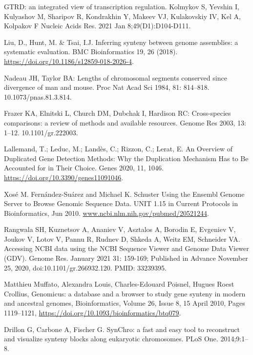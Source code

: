 \documentclass[12pt]{article}
\begin{document}

\normalsize
\begin{thebibliography}{99}

 GTRD: an integrated view of transcription regulation.
Kolmykov S, Yevshin I, Kulyashov M, Sharipov R, Kondrakhin Y, Makeev VJ,
Kulakovskiy IV, Kel A, Kolpakov F Nucleic Acids Res. 2021 Jan
8;49(D1):D104-D111.

 Liu, D., Hunt, M. \& Tsai, I.J. Inferring synteny between
genome assemblies: a systematic evaluation. BMC Bioinformatics 19, 26 (2018).
\url{https://doi.org/10.1186/s12859-018-2026-4}.

 Nadeau JH, Taylor BA: Lengths of chromosomal segments
conserved since divergence of man and mouse. Proc Nat Acad Sci 1984,
81: 814–818. 10.1073/pnas.81.3.814.

 Frazer KA, Elnitski L, Church DM, Dubchak I, Hardison RC:
Cross-species comparisons: a review of methods and available resources.
Genome Res 2003, 13: 1–12. 10.1101/gr.222003.

 Lallemand, T.; Leduc, M.; Landès, C.; Rizzon, C.; Lerat, E.
An Overview of Duplicated Gene Detection Methods: Why the Duplication Mechanism
Has to Be Accounted for in Their Choice. Genes 2020, 11, 1046.
\url{https://doi.org/10.3390/genes11091046}.

 Xosé M. Fernández-Suárez and Michael K. Schuster
Using the Ensembl Genome Server to Browse Genomic Sequence Data.
UNIT 1.15 in Current Protocols in Bioinformatics, Jun 2010.
\url{www.ncbi.nlm.nih.gov/pubmed/20521244}.

 Rangwala SH, Kuznetsov A, Ananiev V, Asztalos A, Borodin E,
Evgeniev V, Joukov V, Lotov V, Pannu R, Rudnev D, Shkeda A, Weitz EM, Schneider
VA. Accessing NCBI data using the NCBI Sequence Viewer and Genome Data Viewer
(GDV). Genome Res. January 2021 31: 159-169; Published in Advance November 25,
2020, doi:10.1101/gr.266932.120. PMID: 33239395.

 Matthieu Muffato, Alexandra Louis, Charles-Edouard Poisnel,
Hugues Roest Crollius, Genomicus: a database and a browser to study gene
synteny in modern and ancestral genomes, Bioinformatics, Volume 26, Issue 8,
15 April 2010, Pages 1119–1121,
\url{https://doi.org/10.1093/bioinformatics/btq079}.

 Drillon G, Carbone A, Fischer G. SynChro: a fast and easy
tool to reconstruct and visualize synteny blocks along eukaryotic chromosomes.
PLoS One. 2014;9:1–8.


\end{thebibliography}
\end{document}
